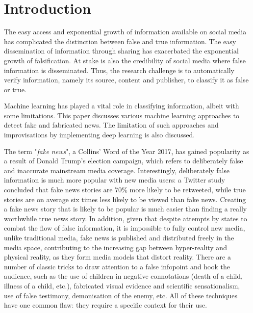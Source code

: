 \newpage
\section{Introduction}\label{sec:intro}

The easy access and exponential growth of information available on social media has complicated the distinction between false and true information.
The easy dissemination of information through sharing has exacerbated the exponential growth of falsification.
At stake is also the credibility of social media where false information is disseminated.
Thus, the research challenge is to automatically verify information, namely its source, content and publisher, to classify it as false or true.

Machine learning has played a vital role in classifying information, albeit with some limitations.
This paper discusses various machine learning approaches to detect fake and fabricated news.
The limitation of such approaches and improvisations by implementing deep learning is also discussed.

The term "\textit{fake news}", a Collins' Word of the Year 2017, has gained popularity as a result of Donald Trump's election campaign, which refers to deliberately false and inaccurate mainstream media coverage.
Interestingly, deliberately false information is much more popular with new media users: a Twitter study concluded that fake news stories are 70\% more likely to be retweeted, while true stories are on average six times less likely to be viewed than fake news.
Creating a fake news story that is likely to be popular is much easier than finding a really worthwhile true news story.
In addition, given that despite attempts by states to combat the flow of false information, it is impossible to fully control new media, unlike traditional media, fake news is published and distributed freely in the media space, contributing to the increasing gap between hyper-reality and physical reality, as they form media models that distort reality.
There are a number of classic tricks to draw attention to a false infopoint and hook the audience, such as the use of children in negative connotations (death of a child, illness of a child, etc.), fabricated visual evidence and scientific sensationalism, use of false testimony, demonisation of the enemy, etc.
All of these techniques have one common flaw: they require a specific context for their use.